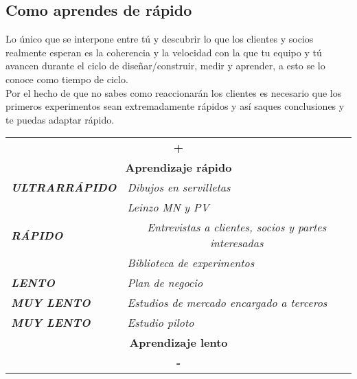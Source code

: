 \documentclass[11pt]{book}
\begin{document}
\subsection{Como aprendes de rápido}
Lo único que se interpone entre tú y descubrir lo que los clientes y socios realmente esperan es la coherencia y la velocidad con la que tu equipo y tú avancen durante el ciclo de diseñar/construir, medir y aprender, a esto se lo conoce como tiempo de ciclo.\\
Por el hecho de que no sabes como reaccionarán los clientes es necesario que los primeros experimentos sean extremadamente rápidos y así saques conclusiones y te puedas adaptar rápido.
\begin{table}[htbp]
  \centering

    \begin{tabular}{cc}
    \multicolumn{2}{c}{\textbf{+}} \\
    \multicolumn{2}{c}{\textbf{Aprendizaje rápido}} \\
    \midrule
    \multicolumn{1}{l|}{\textit{\textbf{ULTRARRÁPIDO}}} & \multicolumn{1}{l}{\textit{Dibujos en servilletas}} \\
    \multicolumn{1}{r|}{} & \multicolumn{1}{l}{\textit{Leinzo MN y PV}} \\
    \multicolumn{1}{l|}{\textit{\textbf{RÁPIDO}}} & \textit{Entrevistas a clientes, socios y partes interesadas} \\
    \multicolumn{1}{r|}{} & \multicolumn{1}{l}{\textit{Biblioteca de experimentos}} \\
    \multicolumn{1}{l|}{\textit{\textbf{LENTO}}} & \multicolumn{1}{l}{\textit{Plan de negocio}} \\
    \multicolumn{1}{l|}{\textit{\textbf{MUY LENTO}}} & \multicolumn{1}{l}{\textit{Estudios de mercado encargado a terceros}} \\
    \multicolumn{1}{l|}{\textit{\textbf{MUY LENTO}}} & \multicolumn{1}{l}{\textit{Estudio piloto}} \\
    \midrule
    \multicolumn{2}{c}{\textbf{Aprendizaje lento}} \\
    \multicolumn{2}{c}{\textbf{-}} \\
    \end{tabular}%
  \label{tab:addlabel}%
\end{table}%
\end{document}
